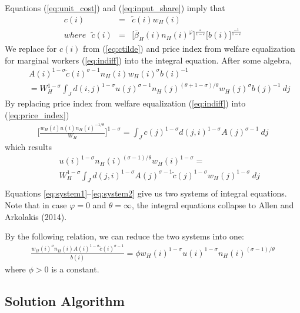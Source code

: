 \documentclass{article}
\begin{document}
Equations (\ref{eq:unit_cost}) and (\ref{eq:input_share}) imply that 
\begin{eqnarray}\label{eq:ctilde}
	c(i) & = & \tilde{c}(i) w_H(i) \nonumber \\
	where~~~ \tilde{c}(i) & = & 
	\Big[\bar{\beta}_H(i) n_H(i)^{\varphi}\Big] ^{\frac{\varepsilon}{1-\varepsilon}} \Big[b(i)\Big]^{\frac{-1}{1-\varepsilon}}
\end{eqnarray}
We replace for $c(i)$ from (\ref{eq:ctilde}) and price index from welfare equalization for marginal workers (\ref{eq:indiff}) into the integral equation. After some algebra,
\begin{eqnarray}\label{eq:system1}
	& & A(i)^{1-\sigma} \tilde{c}(i)^{\sigma-1} n_H(i)  w_H(i)^{\sigma}  b(i)^{-1}  \nonumber \\
	& & =  
	W_H^{1-\sigma}
	\int_J d(i,j)^{1-\sigma} u(j)^{\sigma-1} n_H(j)^{(\theta+1-\sigma)/\theta} w_H(j)^{\sigma} b(j)^{-1}  ~dj
\end{eqnarray}
By replacing price index from welfare equalization (\ref{eq:indiff}) into (\ref{eq:price_index}) 
\begin{eqnarray}
	\Big[ \frac{w_H(i) u(i) n_H(i)^{-1/\theta}}{W_H } \Big]^{1-\sigma} = \int_J c(j)^{1-\sigma}d(j,i)^{1-\sigma}A(j)^{\sigma-1}~ dj \nonumber
\end{eqnarray}
which results
\begin{eqnarray}\label{eq:system2}
 	& &  u(i)^{1-\sigma} n_H(i)^{(\sigma-1)/\theta} w_H(i)^{1-\sigma}  = \nonumber \\ 
 	& & 
 	W_H^{1-\sigma}
 	\int_J  d(j,i)^{1-\sigma} A(j)^{\sigma-1}  \tilde{c}(j)^{1-\sigma} w_H(j)^{1-\sigma}
 	~ dj \nonumber \\
\end{eqnarray}
Equations \ref{eq:system1}--\ref{eq:system2} give us two systems of integral equations. Note that in case $\varphi=0$ and $\theta=\infty$, the integral equations collapse to Allen and Arkolakis (2014). 

By the following relation, we can reduce the two systems into one: 
\begin{eqnarray}\label{eq:systems_relation}
	\frac{w_H(i)^{\sigma}n_H(i)A(i)^{1-\sigma}\tilde{c}(i)^{\sigma-1}}{b(i)} = \phi w_H(i)^{1-\sigma} u(i)^{1-\sigma} n_H(i)^{(\sigma-1)/\theta}
\end{eqnarray}
where $\phi > 0$ is a constant.

\subsection{Solution Algorithm}
\end{document}
